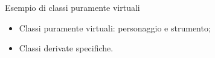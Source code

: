 \documentclass[xcolor={dvipsnames, svgnames, x11names, table}, 10pt]{beamer}
\begin{document}
\begin{frame}{Esempio di classi puramente virtuali}

\begin{itemize}
    \item Classi puramente virtuali: personaggio e strumento;
    \item Classi derivate specifiche.
\end{itemize}

\end{frame}
\end{document}
